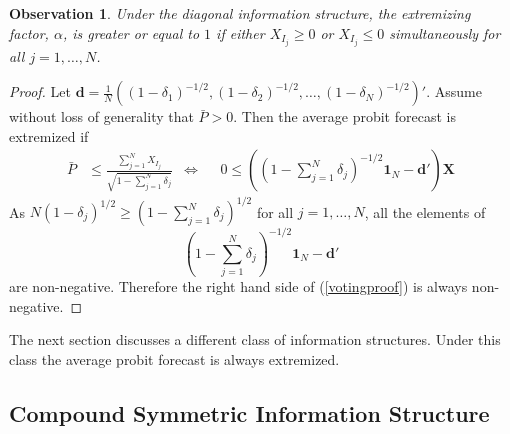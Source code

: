 \documentclass[11pt,twoside]{article}
\newtheorem{observation}[theorem]{Observation}
\begin{document}
\begin{observation}
\label{positiveThmVote}
Under the diagonal information structure, the extremizing factor, $\alpha$, is greater or equal to $1$ if either $X_{I_j} \geq 0$ or  $X_{I_j} \leq 0$ simultaneously for all $j = 1, \dots, N$. 
\end{observation}
\begin{proof} 
Let $\boldsymbol{d} = \frac{1}{N}\left((1-\delta_1)^{-1/2}, (1-\delta_2)^{-1/2}, \dots, (1-\delta_N)^{-1/2}\right)'$. Assume without loss of generality that $\bar{P} > 0$. Then the average probit forecast is extremized if
\begin{align}
 \bar{P}&\leq  \frac{\sum_{j=1}^N X_{I_j}}{\sqrt{1 - \sum_{j=1}^N \delta_j}} &\Leftrightarrow&& 0 \leq  \left(  \left(1 - \sum_{j=1}^N \delta_j \right)^{-1/2} \boldsymbol{1}_N - \boldsymbol{d}' \right) \boldsymbol{X} \label{votingproof}
\end{align}
 As $N (1-\delta_j)^{1/2} \geq \left(1 - \sum_{j=1}^N \delta_j \right)^{1/2}$ for all $j = 1, \dots, N$, all the elements of $$\left(1 - \sum_{j=1}^N \delta_j \right)^{-1/2} \boldsymbol{1}_N - \boldsymbol{d}' $$ are non-negative. Therefore the right hand side of (\ref{votingproof}) is always non-negative. 
\end{proof}
The next section discusses a different class of information structures. Under this class the average probit forecast is always extremized. 

\subsection{Compound Symmetric Information Structure}
\end{document}
